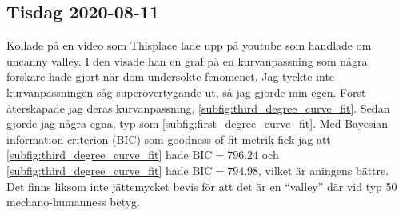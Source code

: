 \subsection*{Tisdag 2020-08-11}

Kollade på en video som Thisplace lade upp på youtube som handlade om uncanny valley. I den visade han en graf på en kurvanpassning som några forskare hade gjort när dom undersökte fenomenet. Jag tyckte inte kurvanpassningen såg superövertygande ut, så jag gjorde min \href{https://github.com/SimonKvantdator/Uncanny-valley-data-analysis.git}{\color{blue}egen}. Först återskapade jag deras kurvanpassning, \cref{subfig:third_degree_curve_fit}. Sedan gjorde jag några egna, typ som \cref{subfig:first_degree_curve_fit}. Med Bayesian information criterion (BIC) som goodness-of-fit-metrik fick jag att \cref{subfig:third_degree_curve_fit} hade $\textrm{BIC} = 796.24$ och \cref{subfig:third_degree_curve_fit} hade $\textrm{BIC} = 794.98$, vilket är aningens bättre. Det finns liksom inte jättemycket bevis för att det är en \enquote{valley} där vid typ 50 mechano-humanness betyg.

